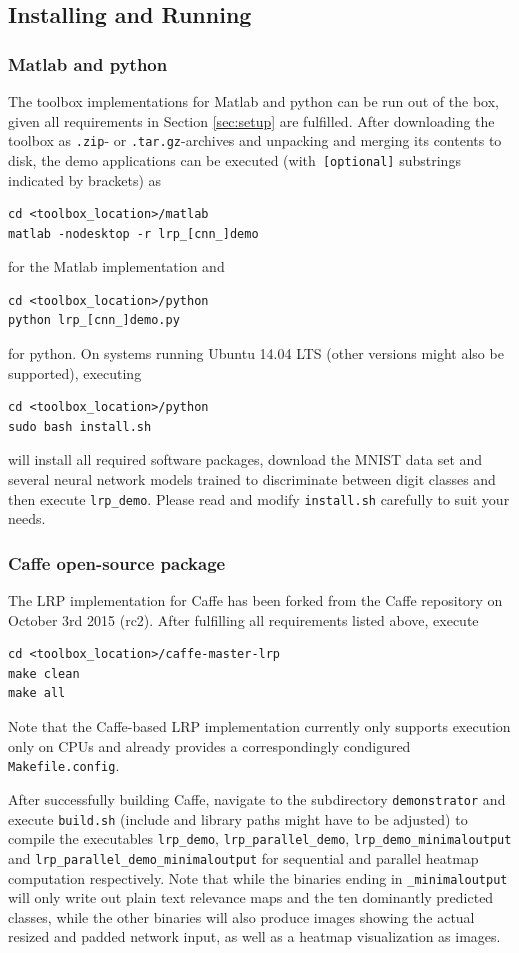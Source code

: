 \documentclass[a4wide]{article}
\begin{document}
\subsection*{Installing and Running}
\subsubsection*{Matlab and python}
The toolbox implementations for Matlab and python can be run out of the box, given all requirements in Section \ref{sec:setup} are fulfilled. After downloading the toolbox as \texttt{.zip}- or \texttt{.tar.gz}-archives and unpacking and merging its contents to disk, the demo applications can be executed (with\verb| [optional]| substrings indicated by brackets) as
\begin{Verbatim}[frame = single]
cd <toolbox_location>/matlab
matlab -nodesktop -r lrp_[cnn_]demo
\end{Verbatim}
for the Matlab implementation and
\begin{Verbatim}[frame = single]
cd <toolbox_location>/python
python lrp_[cnn_]demo.py
\end{Verbatim}
for python. On systems running Ubuntu 14.04 LTS (other versions might also be supported), executing
\begin{Verbatim}[frame = single]
cd <toolbox_location>/python
sudo bash install.sh
\end{Verbatim}
will install all required software packages, download the MNIST \cite{lecun1998mnist} data set and several neural network models trained to discriminate between digit classes and then execute \texttt{lrp\_demo}. Please read and modify \texttt{install.sh} carefully to suit your needs.

\subsubsection*{Caffe open-source package}

The LRP implementation for Caffe has been forked from the Caffe repository on October 3rd 2015 (rc2). After fulfilling all requirements listed above, execute
\begin{Verbatim}[frame = single]
cd <toolbox_location>/caffe-master-lrp
make clean
make all
\end{Verbatim}
Note that the Caffe-based LRP implementation currently only supports execution only on CPUs and already provides a correspondingly condigured \texttt{Makefile.config}.

After successfully building Caffe, navigate to the subdirectory \texttt{demonstrator} and execute \texttt{build.sh} (include and library paths might have to be adjusted) to compile the executables \texttt{lrp\_demo}, \texttt{lrp\_parallel\_demo}, \texttt{lrp\_demo\_minimaloutput} and \texttt{lrp\_parallel\_demo\_minimaloutput} for sequential and parallel heatmap computation respectively. Note that while the binaries ending in \texttt{\_minimaloutput} will only write out plain text relevance maps and the ten dominantly predicted classes, while the other binaries will also produce images showing the actual resized and padded network input, as well as a heatmap visualization as images.
\end{document}
